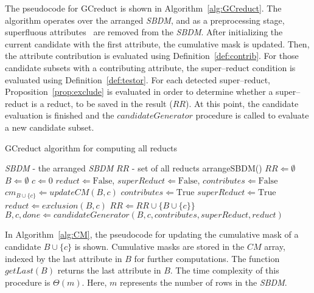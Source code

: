 \documentclass[letterpaper, twoside, openright, 12pt]{book}%
\begin{document}
	The pseudocode for GCreduct is shown in Algorithm~\ref{alg:GCreduct}. The algorithm operates over the arranged \textit{SBDM}, and as a preprocessing stage, superfluous attributes~\cite{Lazo-Cortes2013} are removed from the \textit{SBDM}. After initializing the current candidate with the first attribute, the cumulative mask is updated. Then, the attribute contribution is evaluated using Definition~\ref{def:contrib}. For those candidate subsets with a contributing attribute, the super--reduct condition is evaluated using Definition~\ref{def:testor}. For each detected super--reduct, Proposition~\ref{prop:exclude} is evaluated in order to determine whether a super--reduct is a reduct, to be saved in the result ($RR$). At this point, the candidate evaluation is finished and the $candidateGenerator$ procedure is called to evaluate a new candidate subset.
	
	\begin{algorithm}
	\footnotesize
	\caption{GCreduct algorithm for computing all reducts}
	\label{alg:GCreduct}
	\begin{algorithmic}[1]
		\Require \textit{SBDM} - the arranged \textit{SBDM}
		\Ensure $RR$ - set of all reducts
		\State arrangeSBDM()
		\State $RR \Leftarrow \emptyset$
		\State $B \Leftarrow \emptyset$  
		\State $c \Leftarrow 0$ 
			\State $reduct \Leftarrow \mathrm{False}$, $superReduct \Leftarrow \mathrm{False}$, $contributes \Leftarrow \mathrm{False}$
		  	\State $cm_{B\cup \lbrace c\rbrace} \Leftarrow updateCM(B,c)$
		  	\label{line:contrib}
		  		\State $contributes \Leftarrow \mathrm{True}$
		  		\label{line:superReduct}
		  			\State $superReduct \Leftarrow \mathrm{True}$
		  			\State $reduct \Leftarrow exclusion(B,c)$
		  				\State $RR \Leftarrow RR \cup \lbrace B\cup \lbrace c\rbrace \rbrace$
		  			\EndIf
		  		\EndIf
		  	\EndIf
			\State $B,c,done \Leftarrow candidateGenerator(B,c,contributes,superReduct,reduct)$
		\EndWhile 
		\end{algorithmic}
	\end{algorithm}
	
	In Algorithm~\ref{alg:CM}, the pseudocode for updating the cumulative mask of a candidate $B\cup\lbrace c\rbrace$ is shown. Cumulative masks are stored in the $CM$ array, indexed by the last attribute in $B$ for further computations. The function $getLast(B)$ returns the last attribute in $B$. The time complexity of this procedure is $\Theta(m)$. Here, $m$ represents the number of rows in the \textit{SBDM}.
	
\end{document}
